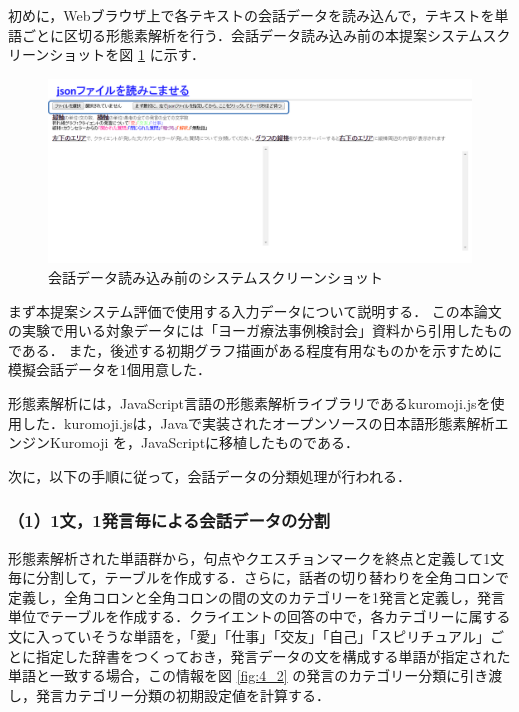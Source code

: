 \documentclass[shuuron]{kuee}
\begin{document}
初めに，Webブラウザ上で各テキストの会話データを読み込んで，テキストを単語ごとに区切る形態素解析を行う．会話データ読み込み前の本提案システムスクリーンショットを図
\ref{fig:yomikomimae2}
に示す．
\begin{figure}
  \begin{center}
    \includegraphics[width=\linewidth]{yomikomimae2.png}
  \end{center}
  \caption{会話データ読み込み前のシステムスクリーンショット}
  \label{fig:yomikomimae2}
\end{figure}

まず本提案システム評価で使用する入力データについて説明する．
この本論文の実験で用いる対象データには「ヨーガ療法事例検討会」資料から引用したものである．
また，後述する初期グラフ描画がある程度有用なものかを示すために模擬会話データを1個用意した．

形態素解析には，JavaScript言語の形態素解析ライブラリであるkuromoji.js\cite{kuromojijs}を使用した．kuromoji.jsは，Javaで実装されたオープンソースの日本語形態素解析エンジンKuromoji
\cite{kuromoji}
を，JavaScriptに移植したものである．

次に，以下の手順に従って，会話データの分類処理が行われる．

\subsubsection{（1）1文，1発言毎による会話データの分割}%
形態素解析された単語群から，句点やクエスチョンマークを終点と定義して1文毎に分割して，テーブルを作成する．さらに，話者の切り替わりを全角コロンで定義し，全角コロンと全角コロンの間の文のカテゴリーを1発言と定義し，発言単位でテーブルを作成する．クライエントの回答の中で，各カテゴリーに属する文に入っていそうな単語を，「愛」「仕事」「交友」「自己」「スピリチュアル」ごとに指定した辞書をつくっておき，発言データの文を構成する単語が指定された単語と一致する場合，この情報を図
\ref{fig:4_2}
の発言のカテゴリー分類に引き渡し，発言カテゴリー分類の初期設定値を計算する．
\end{document}
